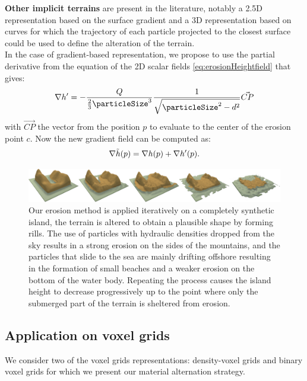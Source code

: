 \textbf{Other implicit terrains}
\label{sec:application_on_other_implicit}
are present in the literature, notably a 2.5D representation based on the surface gradient \cite{Guerin2022} and a 3D representation based on curves \cite{Becher2017} for which the trajectory of each particle projected to the closest surface could be used to define the alteration of the terrain.\\
In the case of gradient-based representation, we propose to use the partial derivative from the equation of the 2D scalar fields \eqref{eq:erosionHeightfield} that gives:
\begin{align} %
\nabla h' = - \frac{Q}{\frac{2}{3}\particleSize^3} \frac{1}{\sqrt{\particleSize^2 - d^2} } \vec{CP}
\end{align}
with $\vec{CP}$ the vector from the position $p$ to evaluate to the center of the erosion point $c$.
Now the new gradient field can be computed as: 
$$
\nabla \Tilde{h}(p) = \nabla h(p) + \nabla h'(p).
$$
\begin{figure}
\centering
\includegraphics{figures/new_continuous_erosion2.png}
\caption{Our erosion method is applied iteratively on a completely synthetic island, the terrain is altered to obtain a plausible shape by forming rills. The use of particles with hydraulic densities dropped from the sky results in a strong erosion on the sides of the mountains, and the particles that slide to the sea are mainly drifting offshore resulting in the formation of small beaches and a weaker erosion on the bottom of the water body. Repeating the process causes the island height to decrease progressively up to the point where only the submerged part of the terrain is sheltered from erosion.}
\label{Erosion-fig:continuous-erosion}

\end{figure}

\subsection{Application on voxel grids}
\label{sec:application_on_voxels}
We consider two of the voxel grids representations: density-voxel grids and binary voxel grids for which we present our material alternation strategy.

